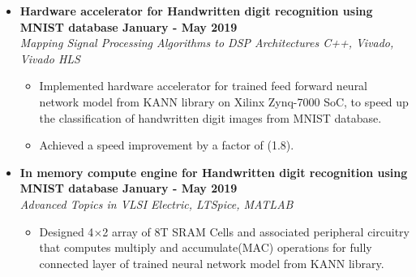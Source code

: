 \documentclass[a4paper,11pt]{article}
\newcommand{\isep}{-2 pt}
\newcommand{\spsep}{-0.75cm}
\begin{document}
\begin{itemize}
	 \item \textbf{Hardware accelerator for Handwritten digit recognition using MNIST database \hfill January - May 2019} \\
	\emph{Mapping Signal Processing Algorithms to DSP Architectures  \hfill C++, Vivado, Vivado HLS} \\[\spsep]
	\begin{itemize} \itemsep \isep
	\item Implemented hardware accelerator for trained feed forward neural network model from KANN library on Xilinx Zynq-7000 SoC, to speed up the classification of handwritten digit images from MNIST database.
		\item Achieved a speed improvement by a factor of (1.8).
	\end{itemize}
	
	\item \textbf{In memory compute engine for Handwritten digit recognition using MNIST database  \hfill January - May 2019} \\
	\emph{Advanced Topics in VLSI \hfill  Electric, LTSpice, MATLAB} \\[\spsep]
	\begin{itemize} \itemsep \isep
		\item Designed 4$\times$2 array of 8T SRAM Cells and associated peripheral circuitry that computes multiply and accumulate(MAC) operations for fully connected layer of trained neural network model from KANN library.

	\end{itemize}
	

\end{itemize}
\end{document}
